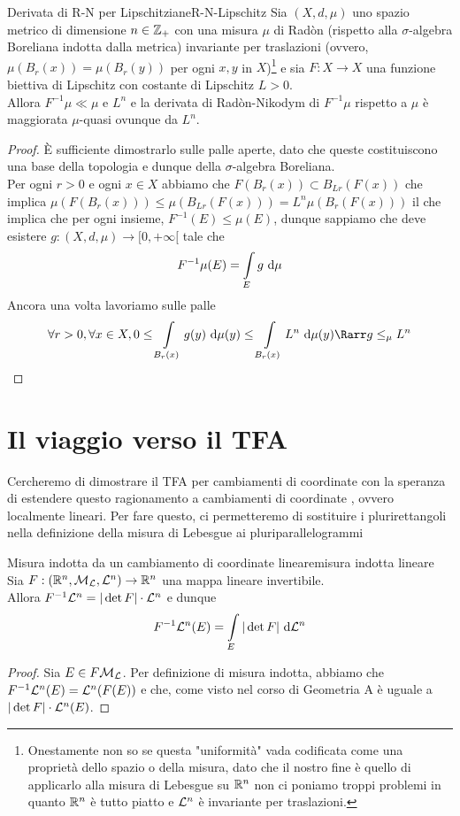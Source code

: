 \documentclass{article}
\begin{document}
\begin{proposition}{Derivata di R-N per Lipschitziane}{R-N-Lipschitz}
    Sia $(X,d,\mu)$ uno spazio metrico di dimensione $n \in \mathbb{Z}_+$ con una misura $\mu$ di Radòn (rispetto alla $\sigma$-algebra Boreliana indotta dalla metrica) invariante per traslazioni (ovvero, $\mu(B_r(x)) = \mu(B_r(y))$ per ogni $x,y$ in $X$)\footnote{Onestamente non so se questa "uniformità" vada codificata come una proprietà dello spazio o della misura, dato che il nostro fine è quello di applicarlo alla misura di Lebesgue su $\mathbb{R}^n$ non ci poniamo troppi problemi in quanto $\mathbb{R}^n$ è tutto piatto e $\mathcal{L}^n$ è invariante per traslazioni.} e sia $F:X \to X$ una funzione biettiva di Lipschitz con costante di Lipschitz $L>0$.\\
    Allora $F^{-1}\mu \ll \mu$ e $L^n$ e la derivata di Radòn-Nikodym di $F^{-1}\mu$ rispetto a $\mu$ è maggiorata $\mu$-quasi ovunque da $L^n$.
    \begin{proof}
        È sufficiente dimostrarlo sulle palle aperte, dato che queste costituiscono una base della topologia e dunque della $\sigma$-algebra Boreliana.\\
        Per ogni $r>0$ e ogni $x \in X$ abbiamo che  $F(B_r(x)) \subset B_{Lr}(F(x))$ che implica $\mu(F(B_r(x)))\le \mu(B_{Lr}(F(x))) = L^n\mu(B_r(F(x)))$ il che implica che per ogni insieme, $F^{-1}(E) \le \mu(E)$, dunque sappiamo che deve esistere $g: (X,d,\mu)\to [0,+\infty[$ tale che
        \[F^{-1}\mu(E) = \intop_E g \de \mu\]
        Ancora una volta lavoriamo sulle palle
        \[\forall r>0,\forall x \in X, 0\le \intop_{B_r(x)} g(y)\de \mu(y) \le \intop_{B_r(x)} L^n \de\mu(y) \Rarr g \le_\mu L^n \]
    \end{proof}
\end{proposition}

\pagebreak
\section{Il viaggio verso il TFA}

Cercheremo di dimostrare il TFA per cambiamenti di coordinate  con la speranza di estendere questo ragionamento a cambiamenti di coordinate , ovvero localmente lineari. Per fare questo, ci permetteremo di sostituire i plurirettangoli nella definizione della misura di Lebesgue ai pluriparallelogrammi

\begin{lemma}{Misura indotta da un cambiamento di coordinate lineare}{misura indotta lineare}
    Sia $F: (\mathbb{R}^n, \mathcal{M}_{\mathcal{L}}, \mathcal{L}^n) \to \mathbb{R}^n$ una mappa lineare invertibile.\\
    Allora $F^{-1}\mathcal{L}^n = |\det F|\cdot \mathcal{L}^n$ e dunque
    \[F^{-1}\L^n(E) = \intop_E |\det F|\de \L^n\]
    \begin{proof}
        Sia $E \in F\mathcal{M}_{\mathcal{L}}$. Per definizione di misura indotta, abbiamo che $F^{-1}\mathcal{L}^n(E) = \mathcal{L}^n(F(E))$ e che, come visto nel corso di Geometria A è uguale a $|\det F|\cdot \mathcal{L}^n(E)$.
    \end{proof}
\end{lemma}
\end{document}
